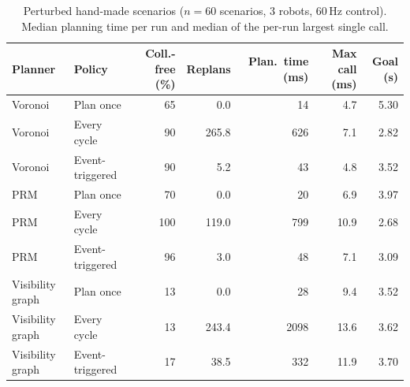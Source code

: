 \begin{table}[t]
\centering
\footnotesize
\caption{Perturbed hand-made scenarios ($n=60$ scenarios, 3 robots, 60\,Hz control). Median planning time per run and median of the per-run largest single call.}
\label{tab:perturbed}
\begin{tabular}{llrrrrr}
\hline
Planner & Policy & Coll.-free (\%) & Replans & Plan.\ time (ms) & Max call (ms) & Goal (s) \\
\hline
Voronoi & Plan once & 65 & 0.0 & 14 & 4.7 & 5.30 \\
Voronoi & Every cycle & 90 & 265.8 & 626 & 7.1 & 2.82 \\
Voronoi & Event-triggered & 90 & 5.2 & 43 & 4.8 & 3.52 \\
PRM & Plan once & 70 & 0.0 & 20 & 6.9 & 3.97 \\
PRM & Every cycle & 100 & 119.0 & 799 & 10.9 & 2.68 \\
PRM & Event-triggered & 96 & 3.0 & 48 & 7.1 & 3.09 \\
Visibility graph & Plan once & 13 & 0.0 & 28 & 9.4 & 3.52 \\
Visibility graph & Every cycle & 13 & 243.4 & 2098 & 13.6 & 3.62 \\
Visibility graph & Event-triggered & 17 & 38.5 & 332 & 11.9 & 3.70 \\
\hline
\end{tabular}
\end{table}
